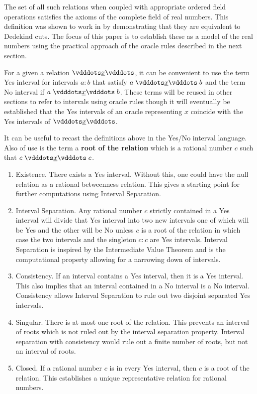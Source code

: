 \documentclass[12pt]{article}
\begin{document}
The set of all such relations when coupled with appropriate ordered field operations satisfies the axioms of the complete field of real numbers. This definition was shown to work in \cite{taylor24dedekind} by demonstrating that they are equivalent to Dedekind cuts. The focus of this paper is to establish these as a model of the real numbers using the practical approach of the oracle rules described in the next section. 

For a given a relation $\xrel$, it can be convenient to use the term Yes interval for intervals $a:b$ that satisfy $a \xrel b$ and the term No interval if \sout{$ a \xrel b$}. These terms will be reused in other sections to refer to intervals using oracle rules though it will eventually be established that the Yes intervals of an oracle representing $x$ coincide with the Yes intervals of $\xrel$.

It can be useful to recast the definitions above in the Yes/No interval language. Also of use is the term a \textbf{root of the relation} which is a rational number $c$ such that $c \xrel c$.

\begin{enumerate}
    \item Existence. There exists a Yes interval. Without this, one could have the null relation as a rational betweenness relation. This gives a starting point for further computations using Interval Separation. 
    \item Interval Separation. Any rational number $c$ strictly contained in a Yes interval will divide that Yes interval into two new intervals one of which will be Yes and the other will be No unless $c$ is a root of the relation in which case the two intervals and the singleton $c:c$ are Yes intervals. Interval Separation is inspired by the Intermediate Value Theorem and is the computational property allowing for a narrowing down of intervals. 
    \item Consistency. If an interval contains a Yes interval, then it is a Yes interval. This also implies that an interval contained in a No interval is a No interval. Consistency allows Interval Separation to rule out two disjoint separated Yes intervals. 
    \item Singular. There is at most one root of the relation. This prevents an interval of roots which is not ruled out by the interval separation property. Interval separation with consistency would rule out a finite number of roots, but not an interval of roots.  
    \item Closed. If a rational number $c$ is in every Yes interval, then $c$ is a root of the relation. This establishes a unique representative relation for rational numbers. 
\end{enumerate}
\end{document}
